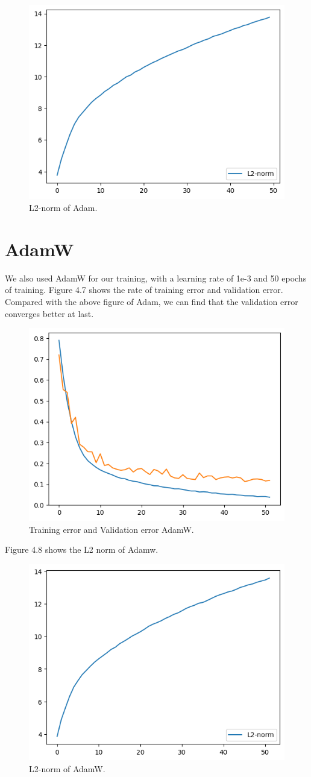 \begin{figure}[H]
    \centering %
        \includegraphics[width=0.6\linewidth]{./ADAMl2.png} 
    \caption{L2-norm of Adam.}
\end{figure}


\section{AdamW}
We also used AdamW for our training, with a learning rate of 1e-3 and 50 epochs of training. Figure 4.7 shows the rate of training error and validation error. Compared with the above figure of Adam, we can find that the validation error converges better at last.
\begin{figure}[H]
    \centering %
        \includegraphics[width=0.6\linewidth]{./ADAMW.png} 
    \caption{Training error and Validation error AdamW.}
\end{figure}

Figure 4.8 shows the L2 norm of Adamw.

\begin{figure}[H]
    \centering %
        \includegraphics[width=0.6\linewidth]{./ADAMWl2.png} 
    \caption{L2-norm of AdamW.}
\end{figure}

